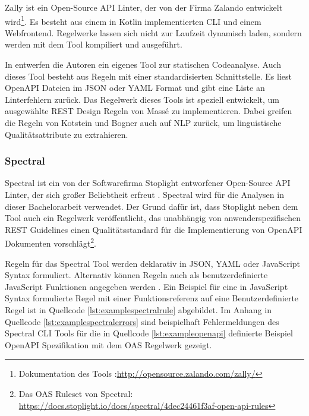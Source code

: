 Zally ist ein Open-Source API Linter, der von der Firma Zalando entwickelt wird\footnote{Dokumentation des Tools :\href{http://opensource.zalando.com/zally/}{http://opensource.zalando.com/zally/}}. Es besteht aus einem in Kotlin implementierten \acf{CLI} und einem Webfrontend. Regelwerke lassen sich nicht zur Laufzeit dynamisch laden, sondern werden mit dem Tool kompiliert und ausgeführt.

In \parencite{bogner_restruler_2024} entwerfen die Autoren ein eigenes Tool zur statischen Codeanalyse. Auch dieses Tool besteht aus Regeln mit einer standardisierten Schnittstelle. Es liest OpenAPI Dateien im \acs{JSON} oder \acs{YAML} Format und gibt eine Liste an Linterfehlern zurück. Das Regelwerk dieses Tools ist speziell entwickelt, um ausgewählte \acs{REST} Design Regeln von Massé \parencite{masse_rest_2011} zu implementieren. Dabei greifen die Regeln von Kotstein und Bogner auch auf \acf{NLP} zurück, um linguistische Qualitätsattribute zu extrahieren.


\subsubsection{Spectral} \label{sec:spectral}
Spectral ist ein von der Softwarefirma Stoplight entworfener Open-Source \acs{API} Linter, der sich großer Beliebtheit erfreut \parencite{bogner_restruler_2024}. Spectral wird für die Analysen in dieser Bachelorarbeit verwendet. Der Grund dafür ist, dass Stoplight neben dem Tool auch ein Regelwerk veröffentlicht, das unabhängig von anwenderspezifischen \acs{REST} Guidelines einen Qualitätsstandard für die Implementierung von OpenAPI Dokumenten vorschlägt\footnote{Das \acs{OAS} Ruleset von Spectral: \href{https://docs.stoplight.io/docs/spectral/4dec24461f3af-open-api-rules}{https://docs.stoplight.io/docs/spectral/4dec24461f3af-open-api-rules}}.

Regeln für das Spectral Tool werden deklarativ in \acs{JSON}, \acs{YAML} oder JavaScript Syntax formuliert. Alternativ können Regeln auch als benutzerdefinierte JavaScript Funktionen angegeben werden \parencite{bogner_restruler_2024}. Ein Beispiel für eine in JavaScript Syntax formulierte Regel mit einer Funktionsreferenz auf eine Benutzerdefinierte Regel ist in Quellcode \ref{lst:examplespectralrule} abgebildet. Im Anhang in Quellcode \ref{lst:examplespectralerrors} sind beispielhaft Fehlermeldungen des Spectral CLI Tools für die in Quellcode \ref{lst:exampleopenapi} definierte Beispiel OpenAPI Spezifikation mit dem \acs{OAS} Regelwerk gezeigt.

